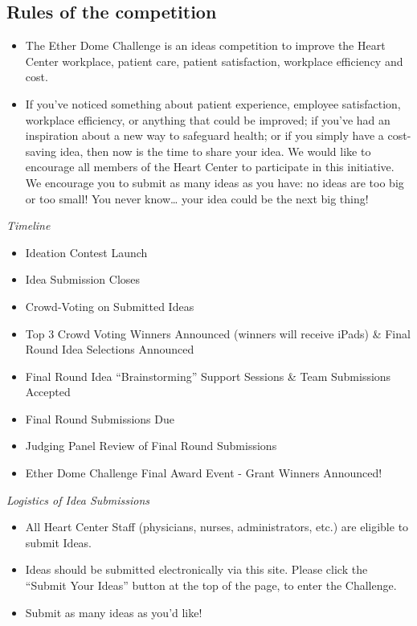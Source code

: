 \documentclass[11pt, titlepage]{article}
\providecommand{\tightlist}{%
  \setlength{\itemsep}{0pt}\setlength{\parskip}{0pt}}
\begin{document}
\subsection{Rules of the competition}\label{rules-of-the-competition}

\begin{itemize}
\item
  The Ether Dome Challenge is an ideas competition to improve the Heart
  Center workplace, patient care, patient satisfaction, workplace
  efficiency and cost.
\item
  If you've noticed something about patient experience, employee
  satisfaction, workplace efficiency, or anything that could be
  improved; if you've had an inspiration about a new way to safeguard
  health; or if you simply have a cost-saving idea, then now is the time
  to share your idea. We would like to encourage all members of the
  Heart Center to participate in this initiative. We encourage you to
  submit as many ideas as you have: no ideas are too big or too small!
  You never know\ldots{} your idea could be the next big thing!
\end{itemize}

\emph{Timeline}

\begin{itemize}
\tightlist
\item
  Ideation Contest Launch
\item
  Idea Submission Closes
\item
  Crowd-Voting on Submitted Ideas
\item
  Top 3 Crowd Voting Winners Announced (winners will receive iPads) \&
  Final Round Idea Selections Announced
\item
  Final Round Idea ``Brainstorming'' Support Sessions \& Team
  Submissions Accepted
\item
  Final Round Submissions Due
\item
  Judging Panel Review of Final Round Submissions
\item
  Ether Dome Challenge Final Award Event - Grant Winners Announced!
\end{itemize}

\emph{Logistics of Idea Submissions}

\begin{itemize}
\tightlist
\item
  All Heart Center Staff (physicians, nurses, administrators, etc.) are
  eligible to submit Ideas.
\item
  Ideas should be submitted electronically via this site. Please click
  the ``Submit Your Ideas'' button at the top of the page, to enter the
  Challenge.
\item
  Submit as many ideas as you'd like!
\end{itemize}
\end{document}
